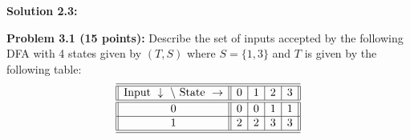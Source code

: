 \documentclass[11pt]{article}
\begin{document}
\textbf{Solution 2.3:}%

\iffalse{  %
\textbf{Problem 2:}
Recall that 
$$\Size_{n,m}(s) = \{f:\{0,1\}^n \to \{0,1\}^m | \exists \mbox{ NAND circuit $C$ of at most $s$ gates s.t. $C$ computes $f$ }\}.$$ 
Let $\Size(s) = \cup_{n \in \N} \cup_{m \in \N} \Size_{n,m}(s)$. 
Prove the following:

\textbf{Problem 2.1 (6 points):} $|\Size(s)| =  2^{O(s \log s)}$. 

\textbf{Solution 2.1:}%

\textbf{Problem 2.2 (12 points):} $|\Size(s)| = 2^{\Omega(s)}$.

\textbf{Solution 2.2:}%

\textbf{Problem 2.3 (2 points):} $\Size(s) \subsetneq \Size(s^2)$, for every sufficiently large $s$.  

\textbf{Solution 2.3:}%
}\fi 


\iffalse %
\textbf{Problem 2.2 (20 points):}
Let $f,g:\{0,1\}^n \to \{0,1\}$ be two functions that differ one only one input. I.e., there exists $a \in \{0,1\}^n$ such that $f(a) \ne g(a)$ and $f(b) = g(b)$ for all $b \in \{0,1\}^n \setminus \{a\}$. Let $S(f)$ denote the size of the smallest NAND circuit computing $f$ and let $S(g)$ denote the size of the smallest circuit computing $S(g)$. (1) Prove that $S(f) \leq S(g) + 10 n$. 

\textbf{Solution 2.2:} (write your solution here)

\textbf{Problem 2.3 (Bonus, Optional, 0 points):}
Use Problem 2.2 to prove that if $n \leq s \leq 2^n/n - 10n$ then $\Size_{n,1}(s) \subsetneq \Size_{n,1}(s+10n)$. 

\textbf{Solution 2.3:} (write your solution here)
\fi


\textbf{Problem 3.1 (15 points):} Describe the set of inputs accepted by the following DFA with 4 states given by $(T,S)$ where $S = \{1,3\}$ and $T$ is given by the following table:
\[
\begin{array}{||c||c|c|c|c||}
\hline
\hline
\mathrm{Input}~\downarrow ~\backslash~ \mathrm{State}~\to & 0 & 1 & 2 & 3 \\
\hline
\hline
0 & 0 & 0 & 1 & 1 \\
\hline
1 & 2 & 2 & 3 & 3 \\
\hline
\hline
\end{array}
\]
\end{document}
